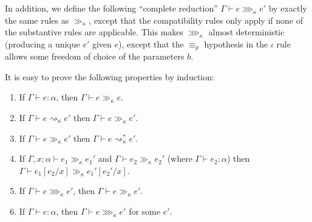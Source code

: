 In addition, we define the following ``complete reduction'' $\Gamma\vdash e\ggg_\kappa e'$ by exactly the same rules as $\gg_\kappa$, except that the compatibility rules only apply if none of the substantive rules are applicable. This makes $\ggg_\kappa$ almost deterministic (producing a unique $e'$ given $e$), except that the $\equiv_p$ hypothesis in the $\iota$ rule allows some freedom of choice of the parameters $b$.

It is easy to prove the following properties by induction:
\begin{lemma}\label{thm:gg_prop}
\begin{enumerate}
\item If $\Gamma\vdash e:\alpha$, then $\Gamma\vdash e\gg_\kappa e$.
\item\label{item:red_gg} If $\Gamma\vdash e\rightsquigarrow_\kappa e'$ then $\Gamma\vdash e\gg_\kappa e'$.
\item\label{item:gg_red} If $\Gamma\vdash e\gg_\kappa e'$ then $\Gamma\vdash e\rightsquigarrow_\kappa^* e'$.
\item\label{item:gg_subst} If $\Gamma,x:\alpha\vdash e_1\gg_\kappa e_1'$ and $\Gamma\vdash e_2\gg_\kappa e_2'$ (where $\Gamma\vdash e_2:\alpha$) then\\ $\Gamma\vdash e_1[e_2/x]\gg_\kappa e_1'[e_2'/x]$.
\item\label{item:ggg_gg} If $\Gamma\vdash e\ggg_\kappa e'$, then $\Gamma\vdash e\gg_\kappa e'$.
\item\label{item:ggg_ex} If $\Gamma\vdash e:\alpha$, then $\Gamma\vdash e\ggg_\kappa e'$ for some $e'$.
\end{enumerate}
\end{lemma}

